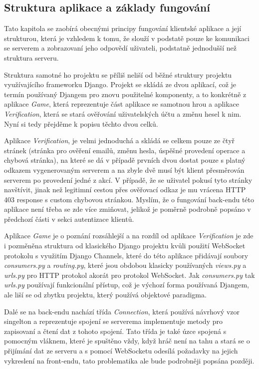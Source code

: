 \documentclass[12pt]{article}
\begin{document}
\subsection{Struktura aplikace a základy fungování}
Tato kapitola se zaobírá obecnými principy fungování klientské aplikace a její strukturou, která je vzhledem k tomu, že slouží v podstatě pouze ke komunikaci se serverem a zobrazovaní jeho odpovědí uživateli, podstatně jednodušší než struktura serveru.

Struktura samotné ho projektu se příliš neliší od běžné struktury projektu využívajícího frameworku Django. Projekt se skládá ze dvou aplikací, což je termín používaný Djangem pro znovu použitelné komponenty, a to konkrétně z aplikace \textit{Game}, která reprezentuje část aplikace se samotnou hrou a aplikace \textit{Verification}, která se stará ověřování uživatelských účtu a změnu hesel k nim. Nyní si tedy přejděme k popisu těchto dvou celků.

Aplikace \textit{Verification}, je velmi jednoduchá a skládá se celkem pouze ze čtyř stránek (stránka pro ověření emailů, změnu hesla, úspěšné provedení operace a chybová stránka), na které se dá v případě prvních dvou dostat pouze s platný odkazem vygenerovaným serverem a na zbyle dvě musí být klient přesměrován serverem po provedení jedné z akcí\cite{redirect}. V případě, že se uživatel pokusí tyto stránky navštívit, jinak než legitimní cestou přes ověřovací odkaz je mu vrácena HTTP 403 response s custom chybovou stránkou. Myslím, že o fungování back-endu této aplikace není třeba se zde více zmiňovat, jelikož je poměrně podrobně popsáno v předchozí části v sekci autentizace klientů.

Aplikace \textit{Game} je o poznání rozsáhlejší a na rozdíl od aplikace \textit{Verification} je zde i pozměněna struktura od klasického Django projektu kvůli použití WebSocket protokolu s využitím Django Channels, které do této aplikace přidávají soubory \textit{consumers.py} a \textit{routing.py}, které jsou obdobou klasicky používaných \textit{views.py} a \textit{urls.py} pro HTTP protokol akorát pro protokol WebSocket. Jak \textit{consumers.py} tak \textit{urls.py} používají funkcionální přístup, což je výchozí forma používaná Djangem, ale liší se od zbytku projektu, který používá objektové paradigma.

Dalé se na back-endu nachází třída \textit{Connection}, která používá návrhový vzor singelton a reprezentuje spojení se serverema implementuje metody pro zapisovaní a čtení dat z tohoto spojení. Tato třída je také úzce spojená s pomocným vláknem, které je spuštěno vždy, když hráč není na tahu a stará se o přijímání dat ze serveru a s pomocí WebSocketu odesílá požadavky na jejich vykreslení na front-endu, tato problematika ale bude podrobněji popsána později.
\end{document}
